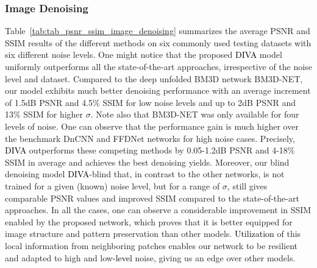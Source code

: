 \documentclass[10pt,journal,compsoc]{IEEEtran}
\newcommand{\sd}{\textcolor{black}}
\newcommand{\dk}{\textcolor{black}}
\begin{document}
\subsubsection{Image Denoising}
\label{sec:result_denoi}


Table~\ref{tab:tab_psnr_ssim_image_denoising} summarizes the average PSNR and SSIM results of the different methods on six commonly used testing datasets with six different noise levels. One might notice that the proposed \dk{DIVA} model uniformly outperforms all the state-of-the-art approaches, irrespective of the noise level and dataset. Compared to the deep unfolded BM3D network BM3D-NET, our model exhibits much better denoising performance with an average increment of 1.5dB PSNR and 4.5\% SSIM for low noise levels and up to 2dB PSNR and 13\% SSIM for higher $\sigma$. Note also that BM3D-NET was only available for four levels of noise. One can observe that the performance gain is much higher over the benchmark DnCNN and FFDNet networks for high noise cases. Precisely, \dk{DIVA} outperforms these competing methods by 0.05-1.2dB PSNR and 4-18\% SSIM in average and achieves the best denoising yields. Moreover, our blind denoising model \dk{DIVA}-blind that, in contrast to the other networks, is not trained for a given (known) noise level, but for a range of $\sigma$, still gives comparable PSNR values and improved SSIM compared to the state-of-the-art approaches. In all the cases, one can observe a considerable improvement in SSIM enabled by the proposed network, which proves that it is better equipped for image structure and pattern preservation than other models.
\sd{Utilization} of this local information from neighboring patches enables our network to be resilient and adapted to high and low-\dk{level} noise, giving us an edge over other models.


\end{document}
